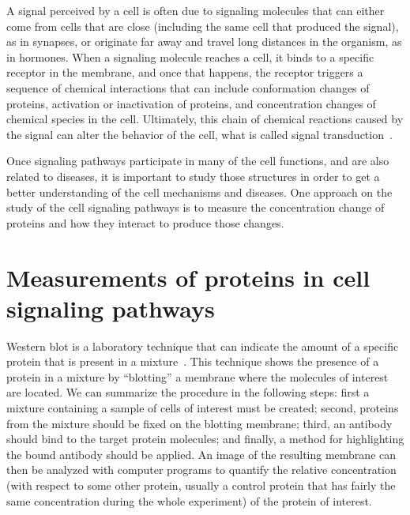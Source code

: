 A signal perceived by a cell is often due to signaling molecules that can either come from cells that are close 
(including the same cell that produced the signal), as in synapses, or originate far away and travel long distances in the organism, as in hormones. When a 
signaling molecule reaches a cell, it binds to a specific receptor in the membrane,
and once that happens, the receptor triggers a sequence of chemical 
interactions that can include conformation changes of proteins, 
activation or inactivation of proteins, and concentration changes of
chemical species in the cell. Ultimately, this chain of chemical 
reactions caused by the signal can alter the behavior of the cell, what 
is called signal transduction~\cite{Lauffenburger5031}.

Once signaling pathways participate in many of the cell functions, and 
are also related to diseases, it is important to study those structures
in order to get a better understanding of the cell mechanisms and 
diseases. One approach on the study of the cell signaling pathways is to 
measure the concentration change of proteins and how they interact to
produce those changes.

\section{Measurements of proteins in cell signaling pathways}
\label{sec:fund_concepts:measurements}
Western blot is a laboratory technique that can 
indicate the amount of a specific protein that is present in a mixture~\cite{Towbin1979}. 
This technique shows the presence of a protein in a mixture by 
``blotting'' a membrane where the molecules of interest are located. We 
can summarize the procedure in the following steps: first a mixture 
containing a sample of cells of interest must be created; 
second, proteins from the mixture should be fixed on the blotting 
membrane; third, an antibody should bind to the target protein 
molecules; and finally, a method for highlighting the bound antibody 
should be applied. An image of the resulting membrane can then be 
analyzed with computer programs to quantify the relative concentration 
(with respect to some other protein, usually a control protein that has 
fairly the same concentration during the whole experiment) of the 
protein of interest.

